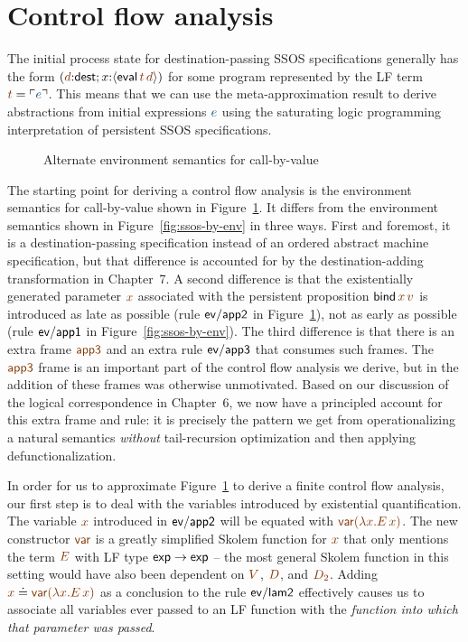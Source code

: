 \section{Control flow analysis}
\label{sec:0cfa}

The initial process state for destination-passing SSOS specifications
generally has the form 
$(\lf{d}{:}{\sf dest}; x{:}\susp{{\sf eval}\,\lf{t}\,\lf{d}})$
for some program represented by the LF term $\lf{t} = \interp{e}$. 
This means that we
can use the meta-approximation result to derive abstractions from
initial expressions $\obj{e}$ using the saturating logic programming
interpretation of persistent SSOS specifications.

\begin{figure}
\caption{Alternate environment semantics for call-by-value}
\label{fig:dest-env}
\end{figure}

The starting point for deriving a control flow analysis is the
environment semantics for call-by-value shown in
Figure~\ref{fig:dest-env}. It differs from the environment semantics
shown in Figure~\ref{fig:ssos-by-env} in three ways. First and
foremost, it is a destination-passing specification instead of an
ordered abstract machine specification, but that difference is
accounted for by the destination-adding transformation in Chapter~7.
A second difference is that the existentially generated parameter $\lf{x}$
associated with the persistent proposition ${\sf bind}\,\lf{x}\,\lf{v}$ is
introduced as late as possible (rule ${\sf ev/app2}$ in
Figure~\ref{fig:dest-env}), not as early as possible (rule ${\sf
  ev/app1}$ in Figure~\ref{fig:ssos-by-env}). The third difference is
that there is an extra frame $\lf{\sf app3}$ and an extra rule ${\sf
  ev/app3}$ that consumes such frames. The $\lf{\sf app3}$ frame is
an important part of the control flow analysis we derive, but in
\cite{simmons11logical} the addition of these frames was otherwise
unmotivated. Based on our discussion of the logical correspondence in
Chapter~6, we now have a principled account for this extra frame and
rule: it is precisely the pattern we get from operationalizing a
natural semantics {\it without} tail-recursion optimization and then
applying defunctionalization.

In order for us to approximate Figure~\ref{fig:dest-env} to derive a
finite control flow analysis, our first step is to deal with the
variables introduced by existential quantification. The variable $\lf{x}$
introduced in ${\sf ev/app2}$ will be equated with $\lf{{\sf var}(\lambda
x.E\,x)}$. The new constructor $\lf{\sf var}$ is a greatly simplified
Skolem function for $\lf{x}$ that only mentions the term $\lf{E}$ with LF type
${\sf exp} \rightarrow {\sf exp}$ -- the most general Skolem function
in this setting would have also been dependent on $\lf{V}$, $\lf{D}$, and
$\lf{D_2}$. Adding $\lf{x} \doteq \lf{{\sf var}(\lambda x.E\,x)}$ 
as a conclusion to
the rule ${\sf ev/lam2}$ effectively causes us to associate all
variables ever passed to an LF function with the {\it function into
  which that parameter was passed}.

